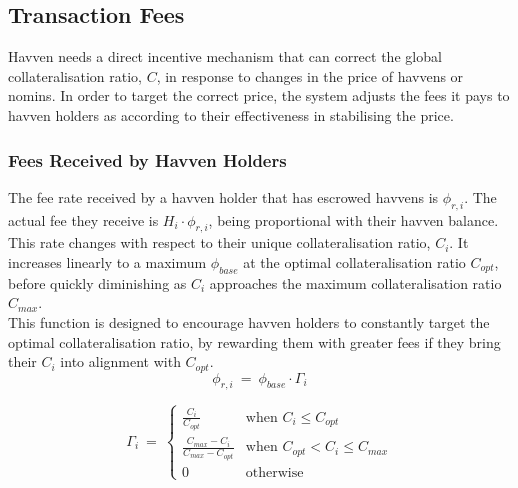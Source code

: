\newpage
\subsection{Transaction Fees}
Havven needs a direct incentive mechanism that can correct the global
collateralisation ratio, \(C\), in response to changes in the price of havvens
or nomins. In order to target the correct price, the system adjusts the fees
it pays to havven holders as according to their effectiveness in stabilising
the price.

\subsubsection{Fees Received by Havven Holders}

\noindent The fee rate received by a havven holder that has escrowed havvens is
\(\phi_{r,i}\). The actual fee they receive is \(H_i \cdot \phi_{r,i}\), being
proportional with their havven balance. This rate changes with respect to
their unique collateralisation ratio, \(C_i\). It increases linearly to a
maximum \(\phi_{base}\) at the optimal collateralisation ratio \(C_{opt}\),
before quickly diminishing as \(C_i\) approaches the maximum collateralisation
ratio \(C_{max}\). \\

\noindent This function is designed to encourage havven holders to constantly
target the optimal collateralisation ratio, by rewarding them with greater
fees if they bring their \(C_i\) into alignment with \(C_{opt}\).\\

\begin{equation}
\phi_{r,i} \ = \ \phi_{base} \cdot \mathit{\Gamma}_{i}  \label{eq:feesreceived}
\end{equation}

\begin{equation}
\mathit{\Gamma}_{i} \ = \
\begin{cases}
 \frac{C_{i}}{C_{opt}} &\mbox{when } C_{i} \leq C_{opt} \\[1em]
 \frac{C_{max} - C_{i}}{C_{max} - C_{opt}} &\mbox{when } C_{opt} < C_{i} \leq C_{max} \\[1em]
 0 &\mbox{otherwise}
 \end{cases}
 \label{eq:7}
\end{equation}

\begin{center}
\end{center}

